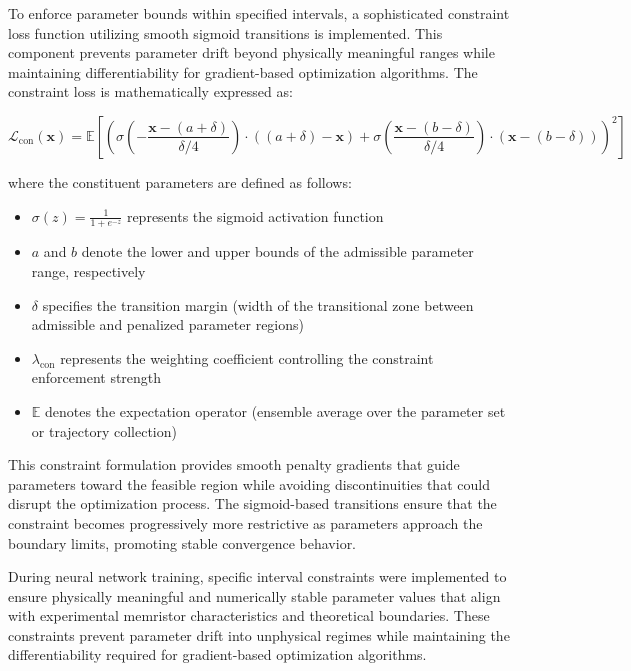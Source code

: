 \documentclass[11pt, oneside]{article}
\begin{document}
To enforce parameter bounds within specified intervals, a sophisticated constraint loss function utilizing smooth sigmoid transitions is implemented. This component prevents parameter drift beyond physically meaningful ranges while maintaining differentiability for gradient-based optimization algorithms. The constraint loss is mathematically expressed as:

\begin{equation}
    \mathcal{L}_{\mathrm{con}}(\mathbf{x}) =  \mathbb{E}\left[\left(
        \sigma\left(-\frac{\mathbf{x} - (a + \delta)}{\delta/4}\right) \cdot ((a + \delta) - \mathbf{x}) +
        \sigma\left(\frac{\mathbf{x} - (b - \delta)}{\delta/4}\right) \cdot (\mathbf{x} - (b - \delta))
        \right)^2\right]
\end{equation}

where the constituent parameters are defined as follows:
\begin{itemize}
    \item $\sigma(z) = \frac{1}{1 + e^{-z}}$ represents the sigmoid activation function
    \item $a$ and $b$ denote the lower and upper bounds of the admissible parameter range, respectively
    \item $\delta$ specifies the transition margin (width of the transitional zone between admissible and penalized parameter regions)
    \item $\lambda_{\mathrm{con}}$ represents the weighting coefficient controlling the constraint enforcement strength
    \item $\mathbb{E}$ denotes the expectation operator (ensemble average over the parameter set or trajectory collection)
\end{itemize}

This constraint formulation provides smooth penalty gradients that guide parameters toward the feasible region while avoiding discontinuities that could disrupt the optimization process. The sigmoid-based transitions ensure that the constraint becomes progressively more restrictive as parameters approach the boundary limits, promoting stable convergence behavior.


During neural network training, specific interval constraints were implemented to ensure physically meaningful and numerically stable parameter values that align with experimental memristor characteristics and theoretical boundaries. These constraints prevent parameter drift into unphysical regimes while maintaining the differentiability required for gradient-based optimization algorithms.
\end{document}

